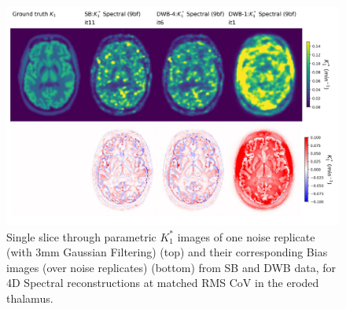 \begin{figure} [ht!]
\centering
\includegraphics[scale=0.47,angle=0]{3_Results/3_2_Dynamic_Reconstruction_SimulationStudy/figures/BrainCuts/K1_BrainCuts.pdf}
\caption{Single slice through parametric $K_1^*$ images of one noise replicate (with 3mm Gaussian Filtering) (top) and their corresponding Bias images (over noise replicates) (bottom) from SB and DWB data, for 4D Spectral reconstructions at matched RMS CoV in the eroded thalamus.}
\label{fig:K1_cuts_bias_matched_rms_CoV}
\end{figure} 


